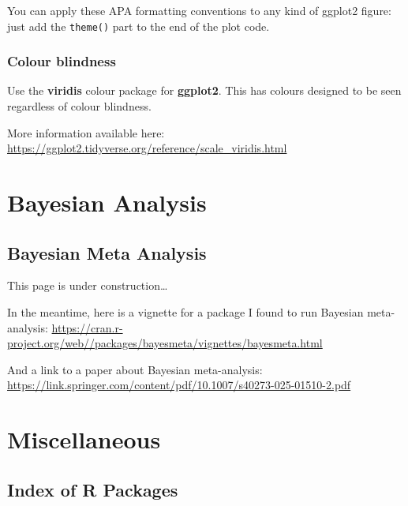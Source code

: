 \documentclass[
  letterpaper,
  DIV=11,
  numbers=noendperiod]{scrreprt}
\begin{document}
\begin{tcolorbox}[enhanced jigsaw, toprule=.15mm, coltitle=black, colframe=quarto-callout-tip-color-frame, colbacktitle=quarto-callout-tip-color!10!white, opacityback=0, left=2mm, breakable, rightrule=.15mm, bottomrule=.15mm, leftrule=.75mm, titlerule=0mm, arc=.35mm, opacitybacktitle=0.6, toptitle=1mm, bottomtitle=1mm, title=\textcolor{quarto-callout-tip-color}{\faLightbulb}\hspace{0.5em}{Tip}, colback=white]

You can apply these APA formatting conventions to any kind of ggplot2
figure: just add the \texttt{theme()} part to the end of the plot code.

\end{tcolorbox}

\section{Colour blindness}\label{colour-blindness}

Use the \textbf{viridis} colour package for \textbf{ggplot2}. This has
colours designed to be seen regardless of colour blindness.

More information available here:
\hyperref[0]{https://ggplot2.tidyverse.org/reference/scale\_viridis.html}

\part{Bayesian Analysis}

\chapter{Bayesian Meta Analysis}\label{bayesian-meta-analysis}

This page is under construction\ldots{} 🚧

In the meantime, here is a vignette for a package I found to run
Bayesian meta-analysis:
\url{https://cran.r-project.org/web//packages/bayesmeta/vignettes/bayesmeta.html}

And a link to a paper about Bayesian meta-analysis:
\url{https://link.springer.com/content/pdf/10.1007/s40273-025-01510-2.pdf}

\part{Miscellaneous}

\chapter{Index of R Packages}\label{index-of-r-packages}
\end{document}
